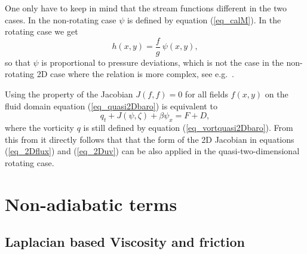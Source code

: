 One only have to keep in mind that the stream functions different in 
the two cases. In the non-rotating case $\psi$ is defined by 
equation (\ref{eq_calM}). In the rotating case we get 
\begin{equation} \label{eq_hquasi2Dbaropsi}
  h(x,y) = \frac{f}{g} \ \psi(x,y),    
\end{equation} 
so that $\psi$ is proportional to pressure deviations, which is not 
the case in the non-rotating 2D case where the relation is more
complex, see e.g.\ \cite{johnstonandliu2004}.

Using the property of the Jacobian $J(f,f) = 0$ for all fields
$f(x,y)$ on the fluid domain equation (\ref{eq_quasi2Dbaro})
is equivalent to
\begin{equation} \label{eq_quasi2Dbarozeta}
  q_{t} + J(\psi,\zeta) + \beta \psi_{x} = F + D,
\end{equation}
where the vorticity $q$ is still defined by equation 
(\ref{eq_vortquasi2Dbaro}). From this from it directly follows that
that the form of the 2D Jacobian in equations 
(\ref{eq_2Dflux}) and (\ref{eq_2Duv}) can be also applied in the 
quasi-two-dimensional rotating case.

\section{Non-adiabatic terms}

\subsection{Laplacian based Viscosity and friction}

